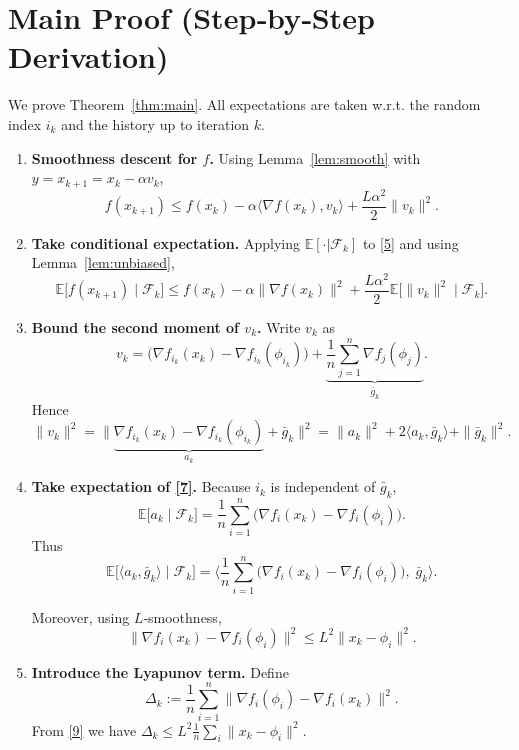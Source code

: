\documentclass{article}
\newcommand{\E}{\mathbb{E}}
\begin{document}
\section*{Main Proof (Step‑by‑Step Derivation)}
We prove Theorem~\ref{thm:main}. All expectations are taken w.r.t. the random index $i_k$ and the history up to iteration $k$.
\begin{enumerate}
\item[Step 1.] \textbf{Smoothness descent for $f$.} Using Lemma~\ref{lem:smooth} with $y=x_{k+1}=x_k-\alpha v_k$,
\[
f(x_{k+1})\le f(x_k)-\alpha\langle\nabla f(x_k),v_k\rangle
+\frac{L\alpha^{2}}{2}\|v_k\|^{2}.
\tag{5}
\]

\item[Step 2.] \textbf{Take conditional expectation.}
Applying $\E[\cdot|\mathcal{F}_k]$ to \eqref{5} and using Lemma~\ref{lem:unbiased},
\[
\E\!\big[f(x_{k+1})\mid\mathcal{F}_k\big]\le
f(x_k)-\alpha\|\nabla f(x_k)\|^{2}
+\frac{L\alpha^{2}}{2}\E\!\big[\|v_k\|^{2}\mid\mathcal{F}_k\big].
\tag{6}
\]

\item[Step 3.] \textbf{Bound the second moment of $v_k$.}
Write $v_k$ as
\[
v_k=\big(\nabla f_{i_k}(x_k)-\nabla f_{i_k}(\phi_{i_k})\big)
+\underbrace{\frac1n\sum_{j=1}^{n}\nabla f_j(\phi_j)}_{\bar g_k}.
\]
Hence
\[
\|v_k\|^{2}
=\big\|\underbrace{\nabla f_{i_k}(x_k)-\nabla f_{i_k}(\phi_{i_k})}_{a_k}
+\bar g_k\big\|^{2}
=\|a_k\|^{2}+2\langle a_k,\bar g_k\rangle+\|\bar g_k\|^{2}.
\tag{7}
\]

\item[Step 4.] \textbf{Take expectation of \eqref{7}.}
Because $i_k$ is independent of $\bar g_k$,
\[
\E\!\big[a_k\mid\mathcal{F}_k\big]=\frac1n\sum_{i=1}^{n}
\big(\nabla f_i(x_k)-\nabla f_i(\phi_i)\big).
\]
Thus
\[
\E\!\big[\langle a_k,\bar g_k\rangle\mid\mathcal{F}_k\big]
=\Big\langle\frac1n\sum_{i=1}^{n}
\big(\nabla f_i(x_k)-\nabla f_i(\phi_i)\big),\;\bar g_k\Big\rangle .
\tag{8}
\]

Moreover, using $L$‑smoothness,
\[
\| \nabla f_i(x_k)-\nabla f_i(\phi_i)\|^{2}
\le L^{2}\|x_k-\phi_i\|^{2}.
\tag{9}
\]

\item[Step 5.] \textbf{Introduce the Lyapunov term.}
Define
\[
\Delta_k:=\frac{1}{n}\sum_{i=1}^{n}\|\nabla f_i(\phi_i)-\nabla f_i(x_k)\|^{2}.
\tag{10}
\]
From \eqref{9} we have $\Delta_k\le L^{2}\frac1n\sum_i\|x_k-\phi_i\|^{2}$.


\end{enumerate}
\end{document}
